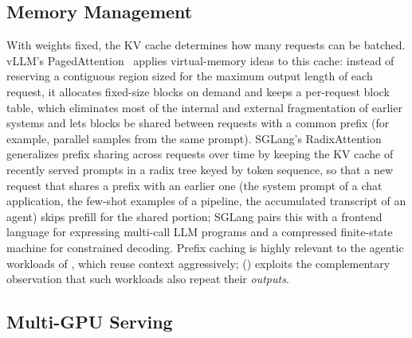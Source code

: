 \subsection{Memory Management}
\label{background:subsec:memory}

With weights fixed, the KV cache determines how many requests can be batched.
vLLM's PagedAttention~\cite{vllm} applies virtual-memory ideas to this cache: instead of reserving a contiguous region sized for the maximum output length of each request, it allocates fixed-size blocks on demand and keeps a per-request block table, which eliminates most of the internal and external fragmentation of earlier systems and lets blocks be shared between requests with a common prefix (for example, parallel samples from the same prompt).
SGLang's RadixAttention~\cite{sglang} generalizes prefix sharing across requests over time by keeping the KV cache of recently served prompts in a radix tree keyed by token sequence, so that a new request that shares a prefix with an earlier one (the system prompt of a chat application, the few-shot examples of a pipeline, the accumulated transcript of an agent) skips prefill for the shared portion; SGLang pairs this with a frontend language for expressing multi-call LLM programs and a compressed finite-state machine for constrained decoding.
Prefix caching is highly relevant to the agentic workloads of , which reuse context aggressively; \SuffixDecoding () exploits the complementary observation that such workloads also repeat their \emph{outputs}.

\subsection{Multi-GPU Serving}
\label{background:subsec:parallelism}

